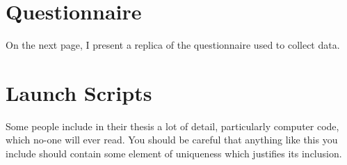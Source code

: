 \documentclass[12pt,a4paper]{report}
\begin{document}











\appendix

\chapter{Questionnaire}\label{app:quest}
On the next page, I present a replica of the questionnaire used to collect data.



\chapter{Launch Scripts}\label{app:launch}

Some people include in their thesis a lot of detail, particularly
computer code, which no-one will ever read. You should be careful that
anything like this you include should contain some element of uniqueness
which justifies its inclusion.



\end{document}
